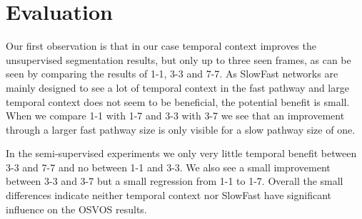 \section{Evaluation}
Our first observation is that in our case temporal context improves the unsupervised segmentation results, but only up to three seen frames, as can be seen by comparing the results of 1-1, 3-3 and 7-7. As SlowFast networks are mainly designed to see a lot of temporal context in the fast pathway and large temporal context does not seem to be beneficial, the potential benefit is small. When we compare 1-1 with 1-7 and 3-3 with 3-7 we see that an improvement through a larger fast pathway size is only visible for a slow pathway size of one.

In the semi-supervised experiments we only very little temporal benefit between 3-3 and 7-7 and no between 1-1 and 3-3. We also see a small improvement between 3-3 and 3-7 but a small regression from 1-1 to 1-7. Overall the small differences indicate neither temporal context nor SlowFast have significant influence on the OSVOS results.


